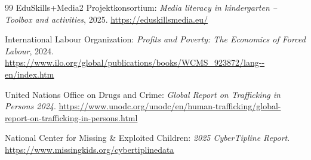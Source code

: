 \documentclass[11pt,a4paper]{article}
\begin{document}
\begin{thebibliography}{99}
		 EduSkills+Media2 Projektkonsortium: \textit{Media literacy in kindergarten – Toolbox and activities}, 2025. \url{https://eduskillsmedia.eu/}
		
		 International Labour Organization: \textit{Profits and Poverty: The Economics of Forced Labour}, 2024. \url{https://www.ilo.org/global/publications/books/WCMS_923872/lang--en/index.htm}
		
		 United Nations Office on Drugs and Crime: \textit{Global Report on Trafficking in Persons 2024}. \url{https://www.unodc.org/unodc/en/human-trafficking/global-report-on-trafficking-in-persons.html}
		
		 National Center for Missing \& Exploited Children: \textit{2025 CyberTipline Report}. \url{https://www.missingkids.org/cybertiplinedata}
		
	\end{thebibliography}
	
\end{document}
